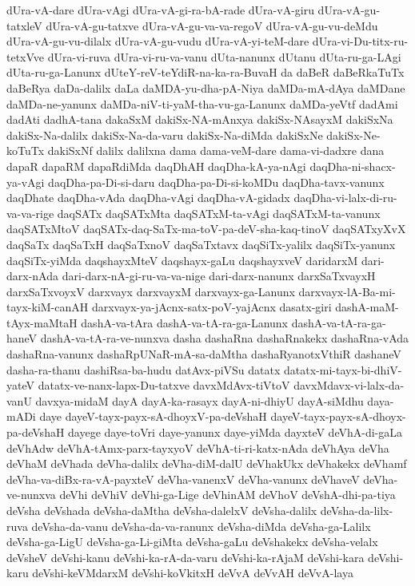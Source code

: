 {dUra-vA-dare
dUra-vAgi
dUra-vA-gi-ra-bA-rade
dUra-vA-giru
dUra-vA-gu-tatxleV
dUra-vA-gu-tatxve
dUra-vA-gu-va-va-regoV
dUra-vA-gu-vu-deMdu
dUra-vA-gu-vu-dilalx
dUra-vA-gu-vudu
dUra-vA-yi-teM-dare
dUra-vi-Du-titx-ru-tetxVve
dUra-vi-ruva
dUra-vi-ru-va-vanu
dUta-nanunx
dUtanu
dUta-ru-ga-LAgi
dUta-ru-ga-Lanunx
dUteY-reV-teYdiR-na-ka-ra-BuvaH
da
daBeR
daBeRkaTuTx
daBeRya
daDa-dalilx
daLa
daMDA-yu-dha-pA-Niya
daMDa-mA-dAya
daMDane
daMDa-ne-yanunx
daMDa-niV-ti-yaM-tha-vu-ga-Lanunx
daMDa-yeVtf
dadAmi
dadAti
dadhA-tana
dakaSxM
dakiSx-NA-mAnxya
dakiSx-NAsayxM
dakiSxNa
dakiSx-Na-dalilx
dakiSx-Na-da-varu
dakiSx-Na-diMda
dakiSxNe
dakiSx-Ne-koTuTx
dakiSxNf
dalilx
dalilxna
dama
dama-veM-dare
dama-vi-dadxre
dana
dapaR
dapaRM
dapaRdiMda
daqDhAH
daqDha-kA-ya-nAgi
daqDha-ni-shacx-ya-vAgi
daqDha-pa-Di-si-daru
daqDha-pa-Di-si-koMDu
daqDha-tavx-vanunx
daqDhate
daqDha-vAda
daqDha-vAgi
daqDha-vA-gidadx
daqDha-vi-lalx-di-ru-va-va-rige
daqSATx
daqSATxMta
daqSATxM-ta-vAgi
daqSATxM-ta-vanunx
daqSATxMtoV
daqSATx-daq-SaTx-ma-toV-pa-deV-sha-kaq-tinoV
daqSATxyXvX
daqSaTx
daqSaTxH
daqSaTxnoV
daqSaTxtavx
daqSiTx-yalilx
daqSiTx-yanunx
daqSiTx-yiMda
daqshayxMteV
daqshayx-gaLu
daqshayxveV
daridarxM
dari-darx-nAda
dari-darx-nA-gi-ru-va-va-nige
dari-darx-nanunx
darxSaTxvayxH
darxSaTxvoyxV
darxvayx
darxvayxM
darxvayx-ga-Lanunx
darxvayx-lA-Ba-mi-tayx-kiM-canAH
darxvayx-ya-jAcnx-satx-poV-yajAcnx
dasatx-giri
dashA-maM-tAyx-maMtaH
dashA-va-tAra
dashA-va-tA-ra-ga-Lanunx
dashA-va-tA-ra-ga-haneV
dashA-va-tA-ra-ve-nunxva
dasha
dashaRna
dashaRnakekx
dashaRna-vAda
dashaRna-vanunx
dashaRpUNaR-mA-sa-daMtha
dashaRyanotxVthiR
dashaneV
dasha-ra-thanu
dashiRsa-ba-hudu
datAvx-piVSu
datatx
datatx-mi-tayx-bi-dhiV-yateV
datatx-ve-nanx-lapx-Du-tatxve
davxMdAvx-tiVtoV
davxMdavx-vi-lalx-da-vanU
davxya-midaM
dayA
dayA-ka-rasayx
dayA-ni-dhiyU
dayA-siMdhu
daya-mADi
daye
dayeV-tayx-payx-sA-dhoyxV-pa-deVshaH
dayeV-tayx-payx-sA-dhoyx-pa-deVshaH
dayege
daye-toVri
daye-yanunx
daye-yiMda
dayxteV
deVhA-di-gaLa
deVhAdw
deVhA-tAmx-parx-tayxyoV
deVhA-ti-ri-katx-nAda
deVhAya
deVha
deVhaM
deVhada
deVha-dalilx
deVha-diM-dalU
deVhakUkx
deVhakekx
deVhamf
deVha-va-diBx-ra-vA-payxteV
deVha-vanenxV
deVha-vanunx
deVhaveV
deVha-ve-nunxva
deVhi
deVhiV
deVhi-ga-Lige
deVhinAM
deVhoV
deVshA-dhi-pa-tiya
deVsha
deVshada
deVsha-daMtha
deVsha-dalelxV
deVsha-dalilx
deVsha-da-lilx-ruva
deVsha-da-vanu
deVsha-da-va-ranunx
deVsha-diMda
deVsha-ga-Lalilx
deVsha-ga-LigU
deVsha-ga-Li-giMta
deVsha-gaLu
deVshakekx
deVsha-velalx
deVsheV
deVshi-kanu
deVshi-ka-rA-da-varu
deVshi-ka-rAjaM
deVshi-kara
deVshi-karu
deVshi-keVMdarxM
deVshi-koVkitxH
deVvA
deVvAH
deVvA-laya
}
